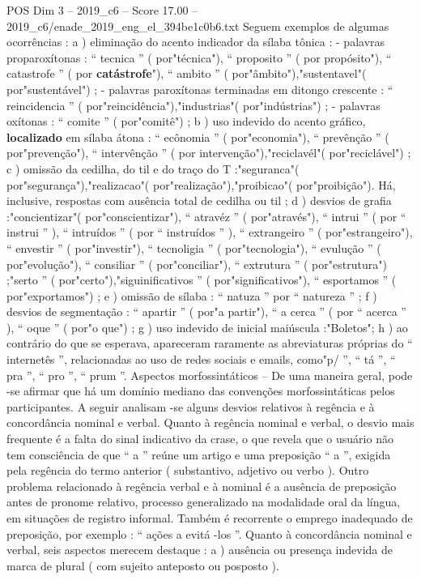 \begin{textsample}{POS Dim 3 – 2019\_c6 – Score 17.00 – 2019\_c6/enade\_2019\_eng\_el\_394be1c0b6.txt}
Seguem exemplos de algumas ocorrências : a ) eliminação do acento indicador da sílaba tônica : - palavras proparoxítonas : “ tecnica ” ( por"técnica"), “ proposito ” ( por propósito"), “ catastrofe ” ( por \textbf{catástrofe}"), “ ambito ” ( por"âmbito"),"sustentavel"( por"sustentável") ; - palavras paroxítonas terminadas em ditongo crescente : “ reincidencia ” ( por"reincidência"),"industrias"( por"indústrias") ; - palavras oxítonas : “ comite ” ( por"comitê") ; b ) uso indevido do acento gráfico, \textbf{localizado} em sílaba átona : “ ecônomia ” ( por"economia"), “ prevênção ” ( por"prevenção"), “ intervênção ” ( por intervenção"),"reciclavél"( por"reciclável") ; c ) omissão da cedilha, do til e do traço do T :"seguranca"( por"segurança"),"realizacao"( por"realização"),"proibicao"( por"proibição").
Há, inclusive, respostas com ausência total de cedilha ou til ; d ) desvios de grafia :"concientizar"( por"conscientizar"), “ atravéz ” ( por"através"), “ intrui ” ( por “ instrui ” ), “ intruídos ” ( por “ instruídos ” ), “ extrangeiro ” ( por"estrangeiro"), “ envestir ” ( por"investir"), “ tecnoligia ” ( por"tecnologia"), “ evulução ” ( por"evolução"), “ consiliar ” ( por"conciliar"), “ extrutura ” ( por"estrutura") ;"serto ” ( por"certo"),"siguinificativos ” ( por"significativos"), “ esportamos ” ( por"exportamos") ; e ) omissão de sílaba : “ natuza ” por “ natureza ” ; f ) desvios de segmentação : “ apartir ” ( por"a partir"), “ a cerca ” ( por “ acerca ” ), “ oque ” ( por"o que") ; g ) uso indevido de inicial maiúscula :"Boletos"; h ) ao contrário do que se esperava, apareceram raramente as abreviaturas próprias do “ internetês ”, relacionadas ao uso de redes sociais e emails, como"p/ ”, “ tá ”, “ pra ”, “ pro ”, “ prum ”.
Aspectos morfossintáticos – De uma maneira geral, pode -se afirmar que há um domínio mediano das convenções morfossintáticas pelos participantes.
A seguir analisam -se alguns desvios relativos à regência e à concordância nominal e verbal.
Quanto à regência nominal e verbal, o desvio mais frequente é a falta do sinal indicativo da crase, o que revela que o usuário não tem consciência de que “ a ” reúne um artigo e uma preposição “ a ”, exigida pela regência do termo anterior ( substantivo, adjetivo ou verbo ).
Outro problema relacionado à regência verbal e à nominal é a ausência de preposição antes de pronome relativo, processo generalizado na modalidade oral da língua, em situações de registro informal.
Também é recorrente o emprego inadequado de preposição, por exemplo : “ ações a evitá -los ”.
Quanto à concordância nominal e verbal, seis aspectos merecem destaque : a ) ausência ou presença indevida de marca de plural ( com sujeito anteposto ou posposto ).

\end{textsample}
